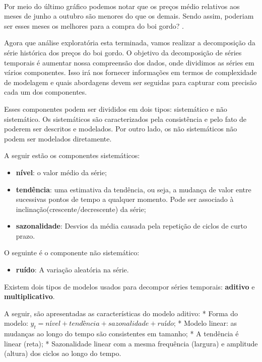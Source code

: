 \documentclass[11pt]{article}
\providecommand{\tightlist}{%
      \setlength{\itemsep}{0pt}\setlength{\parskip}{0pt}}
\begin{document}
    \begin{center}
    \end{center}
    { \hspace*{\fill} \\}
    
    Por meio do último gráfico podemos notar que os preços médio relativos
aos meses de junho a outubro são menores do que os demais. Sendo assim,
poderiam ser esses meses os melhores para a compra do boi gordo? .

Agora que análise exploratória esta terminada, vamos realizar a
decomposição da série histórica dos preços do boi gordo. O objetivo da
decomposição de séries temporais é aumentar nossa compreensão dos dados,
onde dividimos as séries em vários componentes. Isso irá nos fornecer
informações em termos de complexidade de modelagem e quais abordagens
devem ser seguidas para capturar com precisão cada um dos componentes.

Esses componentes podem ser divididos em dois tipos: sistemático e não
sistemático. Os sistemáticos são caracterizados pela consistência e pelo
fato de poderem ser descritos e modelados. Por outro lado, os não
sistemáticos não podem ser modelados diretamente.

A seguir estão os componentes sistemáticos:

\begin{itemize}
\tightlist
\item
  \textbf{nível}: o valor médio da série;
\item
  \textbf{tendência}: uma estimativa da tendência, ou seja, a mudança de
  valor entre sucessivas pontos de tempo a qualquer momento. Pode ser
  associado à inclinação(crescente/decrescente) da série;
\item
  \textbf{sazonalidade}: Desvios da média causada pela repetição de
  ciclos de curto prazo.
\end{itemize}

O seguinte é o componente não sistemático:

\begin{itemize}
\tightlist
\item
  \textbf{ruído}: A variação aleatória na série.
\end{itemize}

Existem dois tipos de modelos usados para decompor séries temporais:
\textbf{aditivo} e \textbf{multiplicativo}.

A seguir, são apresentadas as características do modelo aditivo: * Forma
do modelo: \(y_t = nível + tendência + sazonalidade + ruído\); * Modelo
linear: as mudanças ao longo do tempo são consistentes em tamanho; * A
tendência é linear (reta); * Sazonalidade linear com a mesma frequência
(largura) e amplitude (altura) dos ciclos ao longo do tempo.
\end{document}
